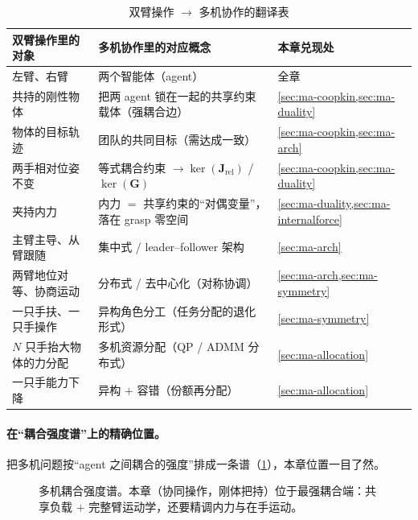 \begin{table}[H]\centering\small
\caption{双臂操作 $\to$ 多机协作的翻译表}
\label{tab:ma-translate}
\begin{tabular}{lll}
\toprule
双臂操作里的对象 & 多机协作里的对应概念 & 本章兑现处 \\
\midrule
左臂、右臂 & 两个智能体（agent） & 全章 \\
共持的刚性物体 & 把两 agent 锁在一起的共享约束载体（强耦合边） & \cref{sec:ma-coopkin,sec:ma-duality} \\
物体的目标轨迹 & 团队的共同目标（需达成一致） & \cref{sec:ma-coopkin,sec:ma-arch} \\
两手相对位姿不变 & 等式耦合约束 $\to\ker(\mathbf{J}_{\text{rel}})$ / $\ker(\mathbf{G})$ & \cref{sec:ma-coopkin,sec:ma-duality} \\
夹持内力 & 内力 $=$ 共享约束的“对偶变量”，落在 grasp 零空间 & \cref{sec:ma-duality,sec:ma-internalforce} \\
主臂主导、从臂跟随 & 集中式 / leader--follower 架构 & \cref{sec:ma-arch} \\
两臂地位对等、协商运动 & 分布式 / 去中心化（对称协调） & \cref{sec:ma-arch,sec:ma-symmetry} \\
一只手扶、一只手操作 & 异构角色分工（任务分配的退化形式） & \cref{sec:ma-symmetry} \\
$N$ 只手抬大物体的力分配 & 多机资源分配（QP / ADMM 分布式） & \cref{sec:ma-allocation} \\
一只手能力下降 & 异构 $+$ 容错（份额再分配） & \cref{sec:ma-allocation} \\
\bottomrule
\end{tabular}
\end{table}

\paragraph{在“耦合强度谱”上的精确位置。}
把多机问题按“agent 之间耦合的强度”排成一条谱（\cref{fig:ma-spectrum}），本章位置一目了然。

\begin{figure}[H]
\centering
{}
\caption{多机耦合强度谱。本章（协同操作，刚体把持）位于最强耦合端：共享负载 $+$ 完整臂运动学，还要精调内力与在手运动。}
\label{fig:ma-spectrum}
\end{figure}


